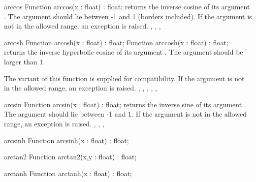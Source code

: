 \begin{function}{arccos}
\Declaration
Function arccos(x : float) : float;
\Description
{} returns the inverse cosine of its argument . The
argument  should lie between -1 and 1 (borders included). 
\Errors
If the argument  is not in the allowed range, an 
exception is raised.
\SeeAlso
{}, , , 
\end{function}


\begin{function}{arcosh}
\Declaration
Function arcosh(x : float) : float;
Function arccosh(x : float) : float;
\Description
{} returns the inverse hyperbolic cosine of its argument . 
The argument  should be larger than 1. 

The  variant of this function is supplied for \delphi 
compatibility.
\Errors
If the argument  is not in the allowed range, an 
exception is raised.
\SeeAlso
{}, , , , ,
\end{function}


\begin{function}{arcsin}
\Declaration
Function arcsin(x : float) : float;
\Description
{} returns the inverse sine of its argument . The
argument  should lie between -1 and 1. 
\Errors
If the argument  is not in the allowed range, an 
exception is raised.
\SeeAlso
{}, , , 
\end{function}



\begin{function}{arcsinh}
\Declaration
Function arcsinh(x : float) : float;
\Description

\Errors
\SeeAlso
\end{function}

\FPCexample{}


\begin{function}{arctan2}
\Declaration
Function arctan2(x,y : float) : float;
\Description

\Errors
\SeeAlso
\end{function}

\FPCexample{}


\begin{function}{arctanh}
\Declaration
Function arctanh(x : float) : float;
\Description

\Errors
\SeeAlso
\end{function}

